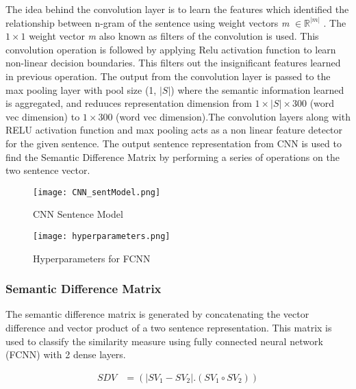 \documentclass[12pt]{report} %
\begin{document}
	The idea behind the convolution layer is to learn the features which identified the relationship between n-gram of the sentence using weight vectors \textit{m} $\in \mathbb{R}^{|m|}$ . The $1 \times 1$ weight vector \textit{m} also known as filters of the convolution is used. This convolution operation is followed by applying Relu activation function to learn non-linear decision boundaries. This filters out the insignificant features learned in previous operation. The output from the convolution layer is passed to the max pooling layer with pool size (1, $|S|$) where the semantic information learned is aggregated, and reduuces representation dimension from $1 \times |S| \times 300$ (word vec dimension) to $1 \times 300$ (word vec dimension).The convolution layers along with RELU activation function and max pooling acts as a non linear  feature detector for the given sentence. The output sentence representation from CNN is used to find the Semantic Difference Matrix by performing a series of operations on the two sentence vector. 
	
	\begin{figure}[!tbp]
		\centering
		\begin{minipage}[b]{0.43\textwidth}
		\centering
		\label{CNN_1}
		\texttt{[image: CNN\_sentModel.png]}
		\caption{CNN Sentence Model \cite{severyn2015learning}}
		\end{minipage}
		\hfill
		\begin{minipage}[b]{0.3\textwidth}
		\centering
		\caption{Hyperparameters for FCNN \cite{shao2017hcti}}
		\label{params}
		
		\texttt{[image: hyperparameters.png]}
		
		\end{minipage}
	\end{figure}
	
	
	\subsubsection*{Semantic Difference Matrix}
	The semantic difference matrix is generated by concatenating the vector difference and vector product of a two sentence representation. This matrix is used to classify the similarity measure using fully connected neural network (FCNN) with 2 dense layers. 
	
		\begin{align*} 
			SDV & =(|SV_{1}- SV_{2}|.(SV_{1} \circ SV_{2})) \\
		\end{align*}
	
\end{document}
